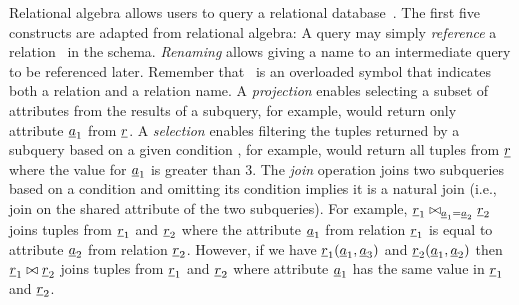 Relational algebra allows users to query a relational database~\cite{AliceBook}.
%
The first five constructs are adapted from relational algebra:
%
A query may simply \emph{reference} a relation \pRel\ in the schema.
\emph{Renaming} allows giving a name to an intermediate query to be referenced
 later. Remember that \pRel\ is an overloaded symbol that indicates both a relation
 and a relation name. 
%
A \emph{projection} enables selecting a subset of attributes from the results
of a subquery, for example, \vPrj[\pAtt_1]{\pRel} would return only attribute $\pAtt_1$
from $\pRel$.
%
A \emph{selection} enables filtering the tuples returned by a subquery based on a
given condition \pCond, for example, \vSel[\pAtt_1 > 3]{\pRel} would return all tuples
from $\pRel$ where the value for $\pAtt_1$ is greater than 3.
%
The \emph{join} operation joins two subqueries based on a condition and
omitting its condition implies it is a natural join (i.e., join on the
shared attribute of the two subqueries).
For example, $\pRel_1 \bowtie_{\pAtt_1 = \pAtt_2} \pRel_2$ joins tuples from $\pRel_1$ 
and $\pRel_2$ where the attribute $\pAtt_1$ from relation $\pRel_1$ is equal to
attribute $\pAtt_2$ from relation $\pRel_2$. However, if we have $\pRel_1(\pAtt_1, \pAtt_3)$
and $\pRel_2 (\pAtt_1, \pAtt_2)$ then
$\pRel_1 \bowtie \pRel_2$ joins tuples from $\pRel_1$ and $\pRel_2$ where
attribute $\pAtt_1$ has the same value in $\pRel_1$ and $\pRel_2$. 

%
